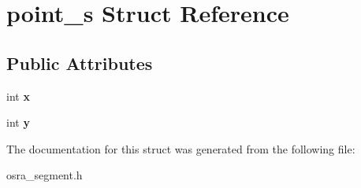 \hypertarget{structpoint__s}{\section{point\-\_\-s Struct Reference}
\label{structpoint__s}
}
\subsection*{Public Attributes}
\begin{DoxyCompactItemize}
\item 
\hypertarget{structpoint__s_a7e248212bc9f699b6c8aab36929a33f2}{int {\bfseries x}}\label{structpoint__s_a7e248212bc9f699b6c8aab36929a33f2}

\item 
\hypertarget{structpoint__s_a2f7004b5a632c501cf73aca8c9724839}{int {\bfseries y}}\label{structpoint__s_a2f7004b5a632c501cf73aca8c9724839}

\end{DoxyCompactItemize}


The documentation for this struct was generated from the following file\-:\begin{DoxyCompactItemize}
\item 
osra\-\_\-segment.\-h\end{DoxyCompactItemize}
